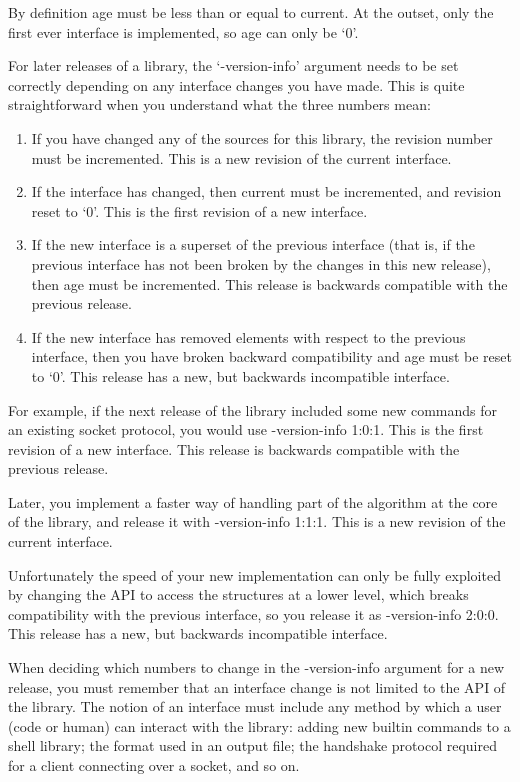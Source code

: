 By definition age must be less than or equal to current. At the outset, only the first ever interface is implemented, so age can only be `0'. 


For later releases of a library, the `-version-info' argument needs to be set correctly depending on any interface changes you have made. This is quite straightforward when you understand what the three numbers mean: 

\begin{enumerate}
\item If you have changed any of the sources for this library, the revision number must be incremented. This is a new revision of the current interface. 

\item If the interface has changed, then current must be incremented, and revision reset to `0'. This is the first revision of a new interface. 

\item If the new interface is a superset of the previous interface (that is, if the previous interface has not been broken by the changes in this new release), then age must be incremented. This release is backwards compatible with the previous release. 

\item If the new interface has removed elements with respect to the previous interface, then you have broken backward compatibility and age must be reset to `0'. This release has a new, but backwards incompatible interface. 
\end{enumerate}

For example, if the next release of the library included some new commands for an existing socket protocol, you would use -version-info 1:0:1. This is the first revision of a new interface. This release is backwards compatible with the previous release. 

Later, you implement a faster way of handling part of the algorithm at the core of the library, and release it with -version-info 1:1:1. This is a new revision of the current interface. 


Unfortunately the speed of your new implementation can only be fully exploited by changing the API to access the structures at a lower level, which breaks compatibility with the previous interface, so you release it as -version-info 2:0:0. This release has a new, but backwards incompatible interface. 

When deciding which numbers to change in the -version-info argument for a new release, you must remember that an interface change is not limited to the API of the library. The notion of an interface must include any method by which a user (code or human) can interact with the library: adding new builtin commands to a shell library; the format used in an output file; the handshake protocol required for a client connecting over a socket, and so on. 


